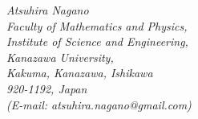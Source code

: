 \documentclass[10pt]{article}
\begin{document}
\begin{center}
\hspace{7.7cm}\textit{Atsuhira  Nagano}\\
\hspace{7.7cm}\textit{Faculty of Mathematics and Physics,}\\
 \hspace{7.7cm} \textit{Institute of Science and Engineering,}\\
\hspace{7.7cm}\textit{Kanazawa University,}\\
\hspace{7.7cm}\textit{Kakuma, Kanazawa, Ishikawa}\\
\hspace{7.7cm}\textit{920-1192, Japan}\\
 \hspace{7.7cm}\textit{(E-mail: atsuhira.nagano@gmail.com)}
  \end{center}
\end{document}
